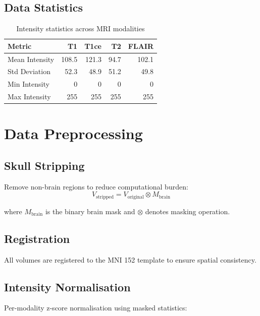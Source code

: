 \documentclass{ecsproject}     %
\begin{document}
\subsection{Data Statistics}

\begin{table}[h]
\centering
\begin{tabular}{|l|r|r|r|r|}
\hline
\textbf{Metric} & \textbf{T1} & \textbf{T1ce} & \textbf{T2} & \textbf{FLAIR} \\
\hline
Mean Intensity & 108.5 & 121.3 & 94.7 & 102.1 \\
Std Deviation & 52.3 & 48.9 & 51.2 & 49.8 \\
Min Intensity & 0 & 0 & 0 & 0 \\
Max Intensity & 255 & 255 & 255 & 255 \\
\hline
\end{tabular}
\caption{Intensity statistics across MRI modalities}
\label{Table:Intensity_Stats}
\end{table}

\section{Data Preprocessing}

\subsection{Skull Stripping}

Remove non-brain regions to reduce computational burden:
\begin{equation}
V_{\text{stripped}} = V_{\text{original}} \otimes M_{\text{brain}}
\end{equation}

where $M_{\text{brain}}$ is the binary brain mask and $\otimes$ denotes masking operation.

\subsection{Registration}

All volumes are registered to the MNI 152 template to ensure spatial consistency.

\subsection{Intensity Normalisation}

Per-modality z-score normalisation using masked statistics:
\end{document}
